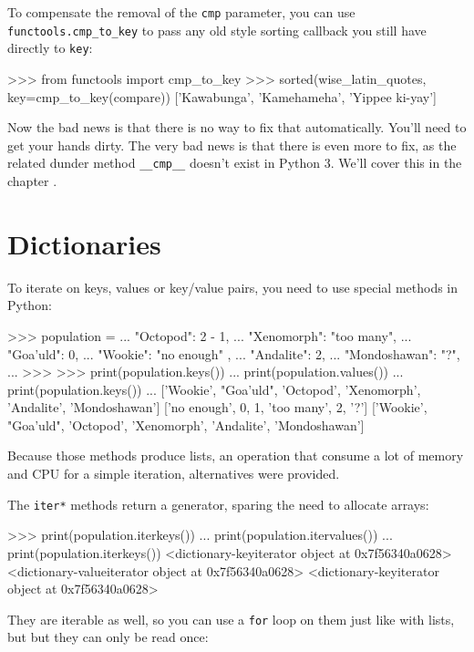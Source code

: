 To compensate the removal of the \lstinline{cmp} parameter, you can use \lstinline{functools.cmp_to_key} to pass any old style sorting callback you still have directly to \lstinline{key}:

\begin{py2and3}
>>> from functools import cmp_to_key
>>> sorted(wise_latin_quotes, key=cmp_to_key(compare))
['Kawabunga', 'Kamehameha', 'Yippee ki-yay']
\end{py2and3}

Now the bad news is that there is no way to fix that automatically. You'll need to get your hands dirty. The very bad news is that there is even more to fix, as the related \gls{dunder} method \lstinline{__cmp__} doesn't exist in Python 3. We'll cover this in the chapter .

\section{Dictionaries}

To iterate on keys, values or key/value pairs, you need to use special methods in Python:

\begin{py2}
>>> population = {
...     "Octopod": 2 - 1,
...     "Xenomorph": "too many",
...     "Goa'uld": 0,
...     "Wookie": "no enough" ,
...     "Andalite": 2,
...     "Mondoshawan": "?",
... }
>>>
>>> print(population.keys())
... print(population.values())
... print(population.keys())
...
['Wookie', "Goa'uld", 'Octopod', 'Xenomorph', 'Andalite', 'Mondoshawan']
['no enough', 0, 1, 'too many', 2, '?']
['Wookie', "Goa'uld", 'Octopod', 'Xenomorph', 'Andalite', 'Mondoshawan']
\end{py2}

Because those methods produce lists, an operation that consume a lot of memory and CPU for a simple iteration, alternatives were provided.

The \lstinline{iter*} methods return a generator, sparing the need to allocate arrays:

\begin{py2}
>>> print(population.iterkeys())
... print(population.itervalues())
... print(population.iterkeys())
<dictionary-keyiterator object at 0x7f56340a0628>
<dictionary-valueiterator object at 0x7f56340a0628>
<dictionary-keyiterator object at 0x7f56340a0628>
\end{py2}

They are \gls{iterable} as well, so you can use a \lstinline{for} loop on them just like with lists, but but they can only be read once:

